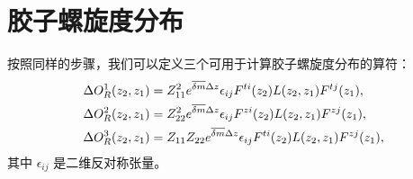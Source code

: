 \section{胶子螺旋度分布}\label{sec:helicity}

按照同样的步骤，我们可以定义三个可用于计算胶子螺旋度分布的算符：
\begin{align}
\Delta {O}^{1}_R(z_2, z_1) &= Z_{11}^2 e^{\overline{\delta { m}}\Delta z}  \epsilon_{ij}  F^{ti}(z_2) L(z_2,z_1) F^{tj}(z_1), \nonumber\\
 \Delta{  O}^{2}_R(z_2,z_1) &=  Z_{22}^2 e^{\overline{\delta { m}}\Delta z} \epsilon_{ij}  F^{zi}(z_2) L(z_2,z_1) F^{zj}(z_1),\nonumber\\
\Delta {O}^{3}_R(z_2,z_1) &=  Z_{11}Z_{22} e^{\overline{\delta { m}}\Delta z}  \epsilon_{ij} F^{ti}(z_2) L(z_2,z_1) F^{zj}(z_1),
\end{align}
其中 $\epsilon_{ij}$ 是二维反对称张量。
